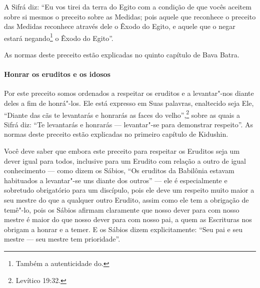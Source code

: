 \begin{multicols}{2}
A Sifrá\starr{} diz: ``Eu vos tirei da terra do Egito com a condição de que
vocês aceitem sobre si mesmos o preceito sobre as Medidas; pois aquele
que reconhece o preceito das Medidas reconhece através dele o Êxodo do
Egito, e aquele que o negar estará negando\footnote{Também a autenticidade do.} o
Êxodo do Egito''.

As normas deste preceito estão explicadas no quinto capítulo de Bava Batra\starr.

\paragraph{Honrar os eruditos e os idosos}

Por este preceito somos ordenados a respeitar os eruditos e a
levantar"-nos diante deles a fim de honrá"-los. Ele está expresso em Suas
palavras, enaltecido seja Ele, ``Diante das cãs te levantarás e
honrarás as faces do velho'',\footnote{Levítico 19:32.} sobre as quais a Sifrá\starr{} diz: ``Te levantarás e honrarás ---
levantar"-se para demonstrar respeito''. As normas deste preceito estão
explicadas no primeiro capítulo de Kidushin\starr.

Você deve saber que embora este preceito para respeitar os Eruditos
seja um dever igual para todos, inclusive para um Erudito com relação a
outro de igual conhecimento --- como dizem os Sábios, ``Os eruditos da
Babilônia estavam habituados a levantar"-se uns diante dos outros'' ---
ele é especialmente e sobretudo obrigatório para um discípulo, pois ele
deve um respeito muito maior a seu mestre do que a qualquer outro
Erudito, assim como ele tem a obrigação de temê"-lo, pois os Sábios
afirmam claramente que nosso dever para com nosso mestre é maior do que
nosso dever para com nosso pai, a quem as Escrituras nos obrigam a
honrar e a temer. E os Sábios dizem explicitamente: ``Seu pai e seu
mestre --- seu mestre tem prioridade''.


\end{multicols}
